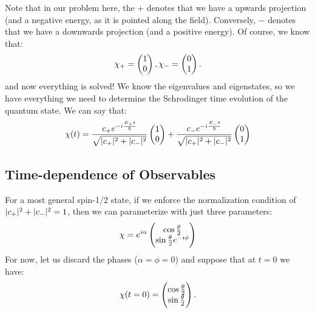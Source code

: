Note that in our problem here, the $+$ denotes that we have a upwards projection (and a negative energy, as it is pointed along the field). Conversely, $-$ denotes that we have a downwards projection (and a positive energy). Of course, we know that:
\begin{equation}
    \chi_+ = \begin{pmatrix}1\\0\end{pmatrix}, \chi_- = \begin{pmatrix}0\\1\end{pmatrix}.
\end{equation}
and now everything is solved! We know the eigenvalues and eigenstates, so we have everything we need to determine the Schrodinger time evolution of the quantum state. We can say that:
\begin{equation}
    \chi(t) = \frac{c_+e^{-i\frac{E_+t}{\hbar}}}{\sqrt{\lvert c_+ \rvert^2 + \lvert c_- \rvert^2}}\begin{pmatrix}1\\0\end{pmatrix} + \frac{c_-e^{-i\frac{E_-t}{\hbar}}}{\sqrt{\lvert c_+ \rvert^2 + \lvert c_- \rvert^2}}\begin{pmatrix}0\\1\end{pmatrix}
\end{equation}

\subsection{Time-dependence of Observables}
For a most general spin-1/2 state, if we enforce the normalization condition of $\lvert c_+ \rvert^2 + \lvert c_- \rvert^2 = 1$, then we can parameterize with just three parameters:
\begin{equation}\label{eq-chigeneral}
    \chi = e^{i\alpha}\m{\cos\frac{\theta}{2} \\ \sin\frac{\theta}{2}e^{-i\phi}}
\end{equation}
For now, let us discard the phases ($\alpha = \phi = 0$) and suppose that at $t = 0$ we have:
\begin{equation}\label{eq-chithetat0}
    \chi(t = 0) = \begin{pmatrix}\cos\frac{\theta}{2} \\ \sin\frac{\theta}{2}\end{pmatrix}.
\end{equation}

